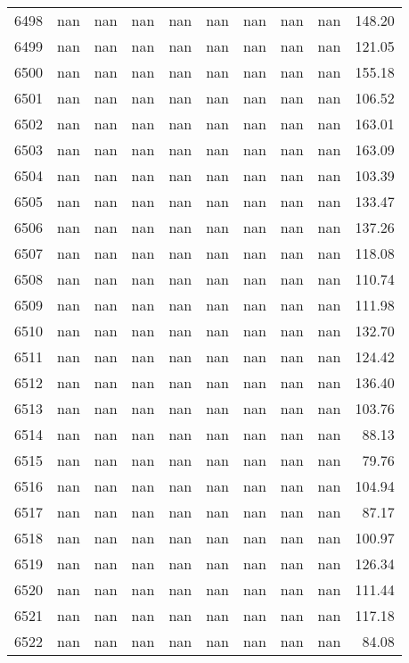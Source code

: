 \begin{tabular}{lrrrrrrrrr}
6498 & nan & nan & nan & nan & nan & nan & nan & nan & 148.20 \\
6499 & nan & nan & nan & nan & nan & nan & nan & nan & 121.05 \\
6500 & nan & nan & nan & nan & nan & nan & nan & nan & 155.18 \\
6501 & nan & nan & nan & nan & nan & nan & nan & nan & 106.52 \\
6502 & nan & nan & nan & nan & nan & nan & nan & nan & 163.01 \\
6503 & nan & nan & nan & nan & nan & nan & nan & nan & 163.09 \\
6504 & nan & nan & nan & nan & nan & nan & nan & nan & 103.39 \\
6505 & nan & nan & nan & nan & nan & nan & nan & nan & 133.47 \\
6506 & nan & nan & nan & nan & nan & nan & nan & nan & 137.26 \\
6507 & nan & nan & nan & nan & nan & nan & nan & nan & 118.08 \\
6508 & nan & nan & nan & nan & nan & nan & nan & nan & 110.74 \\
6509 & nan & nan & nan & nan & nan & nan & nan & nan & 111.98 \\
6510 & nan & nan & nan & nan & nan & nan & nan & nan & 132.70 \\
6511 & nan & nan & nan & nan & nan & nan & nan & nan & 124.42 \\
6512 & nan & nan & nan & nan & nan & nan & nan & nan & 136.40 \\
6513 & nan & nan & nan & nan & nan & nan & nan & nan & 103.76 \\
6514 & nan & nan & nan & nan & nan & nan & nan & nan & 88.13 \\
6515 & nan & nan & nan & nan & nan & nan & nan & nan & 79.76 \\
6516 & nan & nan & nan & nan & nan & nan & nan & nan & 104.94 \\
6517 & nan & nan & nan & nan & nan & nan & nan & nan & 87.17 \\
6518 & nan & nan & nan & nan & nan & nan & nan & nan & 100.97 \\
6519 & nan & nan & nan & nan & nan & nan & nan & nan & 126.34 \\
6520 & nan & nan & nan & nan & nan & nan & nan & nan & 111.44 \\
6521 & nan & nan & nan & nan & nan & nan & nan & nan & 117.18 \\
6522 & nan & nan & nan & nan & nan & nan & nan & nan & 84.08 \\

\end{tabular}
